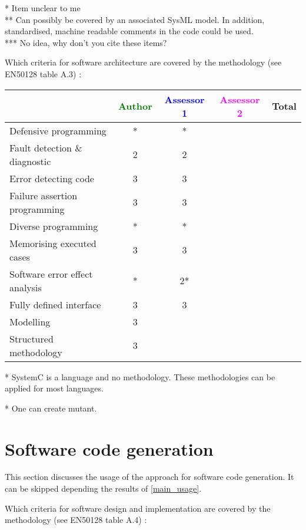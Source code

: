 \begin{author_comment}
* Item unclear to me\\
** Can possibly be covered by an associated SysML model. In addition, standardised, machine readable comments in the code could be used.\\
*** No idea, why don't you cite these items?
\end{author_comment}

Which criteria for software architecture are covered by the methodology
(see EN50128 table A.3) :

\begin{tabular}{|l | c | c | c | c|}
\hline
& \textcolor{green}{Author} & \textcolor{blue}{Assessor 1} & \textcolor{magenta}{Assessor 2} & Total \\
\hline
Defensive programming &* &* & & \\
\hline
Fault detection \& diagnostic &2 &2 & & \\
\hline
Error detecting code &3 &3 & & \\
\hline
Failure assertion programming &3 &3 & & \\
\hline
Diverse programming &* &* & & \\
\hline
Memorising executed cases &3 &3 & & \\
\hline
Software error effect analysis &* &2* & & \\
\hline
Fully defined interface &3 &3 & & \\
\hline
Modelling &3 & & & \\
\hline
Structured methodology &3 & & & \\
\hline
\end{tabular}

\begin{author_comment}
 * SystemC is a language and no methodology. These methodologies can be applied for most languages.
\end{author_comment}
\begin{assessor1}
* One can create mutant.
\end{assessor1}

\section{Software code generation}
This section discusses the usage of the approach for software code generation.
It can be skipped depending the results of \ref{main_usage}.

Which criteria for software design and implementation are covered by the methodology
(see EN50128 table A.4) :

